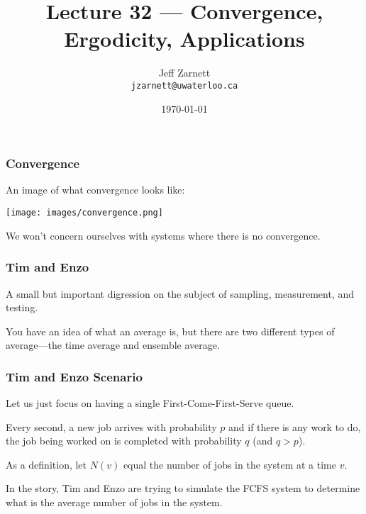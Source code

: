 

\title{Lecture 32 --- Convergence, Ergodicity, Applications}

\author{Jeff Zarnett\\ \small \texttt{jzarnett@uwaterloo.ca}}
\date{\today}




\begin{frame}
  \titlepage

 \end{frame}


\begin{frame}
\frametitle{Convergence}

An image of what convergence looks like:

\begin{center}
	\texttt{[image: images/convergence.png]}
\end{center}

We won't concern ourselves with systems where there is no convergence. 

\end{frame}



\begin{frame}
\frametitle{Tim and Enzo}

A small but important digression on the subject of sampling, measurement, and testing.

You have an idea of what an average is, but there are two different types of average---the time average and ensemble average. 


\end{frame}



\begin{frame}
\frametitle{Tim and Enzo Scenario}

Let us just focus on having a single First-Come-First-Serve queue. 

Every second, a new job arrives with probability $p$ and if there is any work to do, the job being worked on is completed with probability $q$ (and $q > p$). 

As a definition, let $N(v)$ equal the number of jobs in the system at a time $v$. 

In the story, Tim and Enzo are trying to simulate the FCFS system to determine what is the average number of jobs in the system.

\end{frame}



